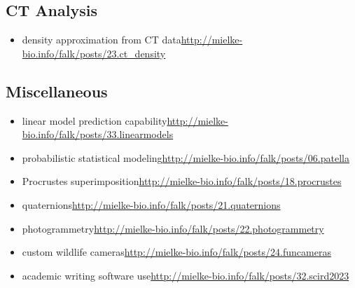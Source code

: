\begin{change}
\subsection{CT Analysis}
\label{sec:org0f99f53}
\begin{itemize}
\item density approximation from CT data\newline \url{http://mielke-bio.info/falk/posts/23.ct\_density}
\end{itemize}
\subsection{Miscellaneous}
\label{sec:orgfc7ff29}
\begin{itemize}
\item linear model prediction capability\newline \url{http://mielke-bio.info/falk/posts/33.linearmodels}
\item probabilistic statistical modeling\newline \url{http://mielke-bio.info/falk/posts/06.patella}
\item Procrustes superimposition\newline \url{http://mielke-bio.info/falk/posts/18.procrustes}
\item quaternions\newline \url{http://mielke-bio.info/falk/posts/21.quaternions}
\item photogrammetry\newline \url{http://mielke-bio.info/falk/posts/22.photogrammetry}
\item custom wildlife cameras\newline \url{http://mielke-bio.info/falk/posts/24.funcameras}
\item academic writing software use\newline \url{http://mielke-bio.info/falk/posts/32.scird2023}
\end{itemize}

\end{change}
